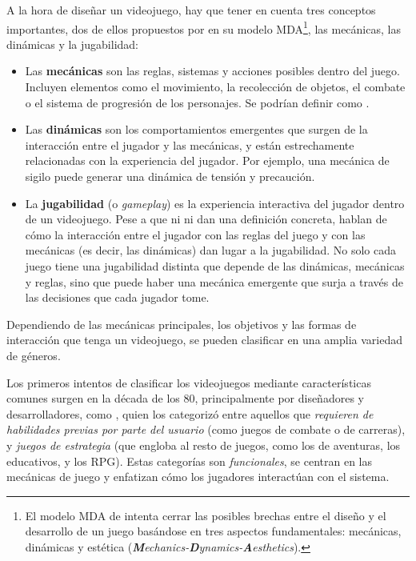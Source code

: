 A la hora de diseñar un videojuego, hay que tener en cuenta tres conceptos importantes, dos de ellos propuestos por \cite{mda} en su modelo MDA\footnote{El modelo MDA de \citeauthor{mda} intenta cerrar las posibles brechas entre el diseño y el desarrollo de un juego basándose en tres aspectos fundamentales: mecánicas, dinámicas y estética (\textit{\textbf{M}echanics-\textbf{D}ynamics-\textbf{A}esthetics}).}, las mecánicas, las dinámicas y la jugabilidad:
\begin{itemize}
	\item Las \textbf{mecánicas} son las reglas, sistemas y acciones posibles dentro del juego. Incluyen elementos como el movimiento, la recolección de objetos, el combate o el sistema de progresión de los personajes. Se podrían definir como .
	\item Las \textbf{dinámicas} son los comportamientos emergentes que surgen de la interacción entre el jugador y las mecánicas, y están estrechamente relacionadas con la experiencia del jugador. Por ejemplo, una mecánica de sigilo puede generar una dinámica de tensión y precaución.
	\item La \textbf{jugabilidad} (o \textit{gameplay}) es la experiencia interactiva del jugador dentro de un videojuego. Pese a que ni \cite{tekinbas2003rules} ni \cite{schell2019art} dan una definición concreta, hablan de cómo la interacción entre el jugador con las reglas del juego y con las mecánicas (es decir, las dinámicas) dan lugar a la jugabilidad. No solo cada juego tiene una jugabilidad distinta que depende de las dinámicas, mecánicas y reglas, sino que puede haber una mecánica emergente que surja a través de las decisiones que cada jugador tome.
\end{itemize}

\medskip

Dependiendo de las mecánicas principales, los objetivos y las formas de interacción que tenga un videojuego, se pueden clasificar en una amplia variedad de géneros.

\smallskip

Los primeros intentos de clasificar los videojuegos mediante características comunes surgen en la década de los 80, principalmente por diseñadores y desarrolladores, como \cite{Crawford84}, quien los categorizó entre aquellos que \textit{requieren de habilidades previas por parte del usuario} (como juegos de combate o de carreras), y \textit{juegos de estrategia} (que engloba al resto de juegos, como los de aventuras, los educativos, y los RPG). Estas categorías son \textit{funcionales}, se centran en las mecánicas de juego y enfatizan cómo los jugadores interactúan con el sistema.

